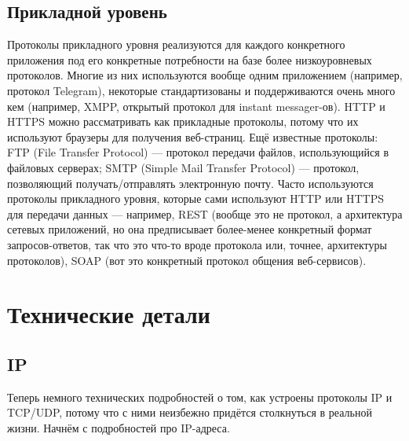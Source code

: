 \documentclass[a5paper]{article}
\begin{document}
\subsection{Прикладной уровень}

Протоколы прикладного уровня реализуются для каждого конкретного приложения под его конкретные потребности на базе более низкоуровневых протоколов. Многие из них используются вообще одним приложением (например, протокол Telegram), некоторые стандартизованы и поддерживаются очень много кем (например, XMPP, открытый протокол для instant messager-ов). HTTP и HTTPS можно рассматривать как прикладные протоколы, потому что их используют браузеры для получения веб-страниц. Ещё известные протоколы: FTP (File Transfer Protocol) --- протокол передачи файлов, использующийся в файловых серверах; SMTP (Simple Mail Transfer Protocol) --- протокол, позволяющий получать/отправлять электронную почту. Часто используются протоколы прикладного уровня, которые сами используют HTTP или HTTPS для передачи данных --- например, REST (вообще это не протокол, а архитектура сетевых приложений, но она предписывает более-менее конкретный формат запросов-ответов, так что это что-то вроде протокола или, точнее, архитектуры протоколов), SOAP (вот это конкретный протокол общения веб-сервисов).

\section{Технические детали}

\subsection{IP}

Теперь немного технических подробностей о том, как устроены протоколы IP и TCP/UDP, потому что с ними неизбежно придётся столкнуться в реальной жизни. Начнём с подробностей про IP-адреса.
\end{document}
